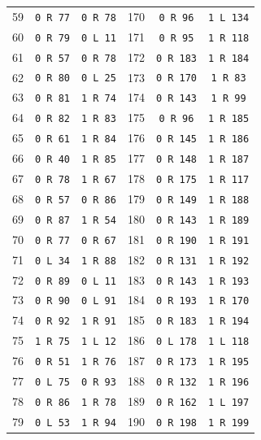 \begin{longtable}{@{}rcc@{\hspace{14mm}}rcc@{}}
59 & \texttt{0 R 77} & \texttt{0 R 78} & 170 & \texttt{0 R 96} & \texttt{1 L 134}\\
60 & \texttt{0 R 79} & \texttt{0 L 11} & 171 & \texttt{0 R 95} & \texttt{1 R 118}\\
61 & \texttt{0 R 57} & \texttt{0 R 78} & 172 & \texttt{0 R 183} & \texttt{1 R 184}\\
62 & \texttt{0 R 80} & \texttt{0 L 25} & 173 & \texttt{0 R 170} & \texttt{1 R 83}\\
63 & \texttt{0 R 81} & \texttt{1 R 74} & 174 & \texttt{0 R 143} & \texttt{1 R 99}\\
64 & \texttt{0 R 82} & \texttt{1 R 83} & 175 & \texttt{0 R 96} & \texttt{1 R 185}\\
65 & \texttt{0 R 61} & \texttt{1 R 84} & 176 & \texttt{0 R 145} & \texttt{1 R 186}\\
66 & \texttt{0 R 40} & \texttt{1 R 85} & 177 & \texttt{0 R 148} & \texttt{1 R 187}\\
67 & \texttt{0 R 78} & \texttt{1 R 67} & 178 & \texttt{0 R 175} & \texttt{1 R 117}\\
68 & \texttt{0 R 57} & \texttt{0 R 86} & 179 & \texttt{0 R 149} & \texttt{1 R 188}\\
69 & \texttt{0 R 87} & \texttt{1 R 54} & 180 & \texttt{0 R 143} & \texttt{1 R 189}\\
70 & \texttt{0 R 77} & \texttt{0 R 67} & 181 & \texttt{0 R 190} & \texttt{1 R 191}\\
71 & \texttt{0 L 34} & \texttt{1 R 88} & 182 & \texttt{0 R 131} & \texttt{1 R 192}\\
72 & \texttt{0 R 89} & \texttt{0 L 11} & 183 & \texttt{0 R 143} & \texttt{1 R 193}\\
73 & \texttt{0 R 90} & \texttt{0 L 91} & 184 & \texttt{0 R 193} & \texttt{1 R 170}\\
74 & \texttt{0 R 92} & \texttt{1 R 91} & 185 & \texttt{0 R 183} & \texttt{1 R 194}\\
75 & \texttt{1 R 75} & \texttt{1 L 12} & 186 & \texttt{0 L 178} & \texttt{1 L 118}\\
76 & \texttt{0 R 51} & \texttt{1 R 76} & 187 & \texttt{0 R 173} & \texttt{1 R 195}\\
77 & \texttt{0 L 75} & \texttt{0 R 93} & 188 & \texttt{0 R 132} & \texttt{1 R 196}\\
78 & \texttt{0 R 86} & \texttt{1 R 78} & 189 & \texttt{0 R 162} & \texttt{1 L 197}\\
79 & \texttt{0 L 53} & \texttt{1 R 94} & 190 & \texttt{0 R 198} & \texttt{1 R 199}\\

\end{longtable}
